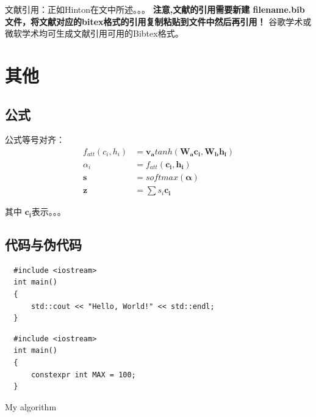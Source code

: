 \documentclass{template} %
\begin{document}
  文献引用：正如Hinton在文\cite{lecun2015deep}\cite{xu2015show}中所述。。。
\textbf{注意,文献的引用需要新建 filename.bib 文件，将文献对应的bitex格式的引用复制粘贴到文件中然后再引用！}
谷歌学术或微软学术均可生成文献引用可用的Bibtex格式。

\section{其他}
\subsection{公式}
公式等号对齐：
\begin{align}
  f_{att}(c_i, h_i) &= \boldsymbol{v_a}tanh(\boldsymbol{W_ac_i},\boldsymbol{W_bh_i})\\
  \alpha_i &= f_{att}(\boldsymbol{c_i}, \boldsymbol{h_i})\\
  \boldsymbol{s} &= softmax(\boldsymbol{\alpha})\\
  \boldsymbol{z} &= \sum{s_i\boldsymbol{c_i}}  
\end{align}

  其中 $\boldsymbol{c_i}$表示。。。

\subsection{代码与伪代码}
{\setmainfont{Courier New Bold} %
  \begin{lstlisting}
  #include <iostream>
  int main()
  {
      std::cout << "Hello, World!" << std::endl;
  }  
  \end{lstlisting}
                  
  \begin{lstlisting}
  #include <iostream>
  int main()
  {
      constexpr int MAX = 100;
  }  
  \end{lstlisting}
}

\makeatletter  
\def\BState{\State\hskip-\ALG@thistlm}  
\makeatother  
\begin{algorithm}  
\caption{My algorithm}\label{euclid}  
\end{algorithm}  
\end{document}
